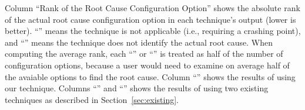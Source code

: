 \begin{table*}[t]
{{Column ``Rank of the Root Cause Configuration Option'' shows the
absolute rank of the actual root
cause configuration option in each technique's output (lower is better).
``\x'' means the technique is not applicable (i.e., requiring a crashing
point), and ``\n'' means the technique does not identify the actual root cause.
When computing the average rank, each ``\x'' or ``\n'' is treated as
half of the number of configuration options, because a user would need to examine
on average half of the avaiable options to find the root cause.
Column ``\ourtool'' shows the results
of using our technique. Columns ``\prevtool'' and ``\conftool'' shows
the results of using two existing techniques as described in Section~\ref{sec:existing}.
}
}
\end{table*}
